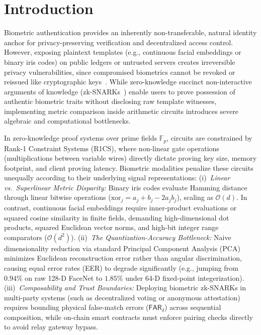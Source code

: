 \documentclass[10pt,letterpaper,journal]{IEEEtran}
\begin{document}


\section{Introduction}
\label{sec:intro}

Biometric authentication provides an inherently non-transferable, natural identity anchor for privacy-preserving verification and decentralized access control. However, exposing plaintext templates (e.g., continuous facial embeddings or binary iris codes) on public ledgers or untrusted servers creates irreversible privacy vulnerabilities, since compromised biometrics cannot be revoked or reissued like cryptographic keys~\cite{Jain2008,Rathgeb2011}. While zero-knowledge succinct non-interactive arguments of knowledge (zk-SNARKs~\cite{Groth2016}) enable users to prove possession of authentic biometric traits without disclosing raw template witnesses, implementing metric comparison inside arithmetic circuits introduces severe algebraic and computational bottlenecks.

In zero-knowledge proof systems over prime fields $\mathbb{F}_p$, circuits are constrained by Rank-1 Constraint Systems (R1CS), where non-linear gate operations (multiplications between variable wires) directly dictate proving key size, memory footprint, and client proving latency. Biometric modalities penalize these circuits unequally according to their underlying signal representations:
(i)~\emph{Linear vs.\ Superlinear Metric Disparity:} Binary iris codes evaluate Hamming distance through linear bitwise operations ($\text{xor}_j = a_j + b_j - 2a_j b_j$), scaling as $\mathcal{O}(d)$. In contrast, continuous facial embeddings require inner-product evaluations or squared cosine similarity in finite fields, demanding high-dimensional dot products, squared Euclidean vector norms, and high-bit integer range comparators ($\mathcal{O}(d^2)$).
(ii)~\emph{The Quantization-Accuracy Bottleneck:} Naive dimensionality reduction via standard Principal Component Analysis (PCA) minimizes Euclidean reconstruction error rather than angular discrimination, causing equal error rates (EER) to degrade significantly (e.g., jumping from $0.94\%$ on raw 128-D FaceNet to $1.85\%$ under 64-D fixed-point integerization).
(iii)~\emph{Composability and Trust Boundaries:} Deploying biometric zk-SNARKs in multi-party systems (such as decentralized voting or anonymous attestation) requires bounding physical false-match errors ($\mathsf{FAR}_\delta$) across sequential composition, while on-chain smart contracts must enforce pairing checks directly to avoid relay gateway bypass.
\end{document}
